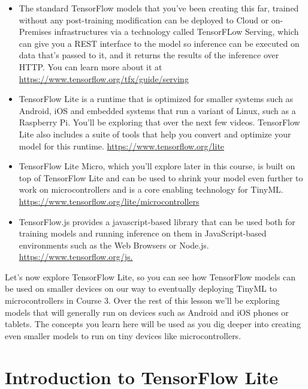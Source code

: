 \begin{itemize}
  \item The standard TensorFlow models that you’ve been creating this far, trained without any post-training modification can be deployed to Cloud or on-Premises infrastructures via a technology called TensorFLow Serving, which can give you a REST interface to the model so inference can be executed on data that’s passed to it, and it returns the results of the inference over HTTP.  You can learn more about it at \url{https://www.tensorflow.org/tfx/guide/serving}

  \item TensorFlow Lite is a runtime that is optimized for smaller systems such as Android, iOS and embedded systems that run a variant of Linux, such as a Raspberry Pi. You’ll be exploring that over the next few videos. TensorFlow Lite also includes  a suite of tools that help you convert and optimize your model for this runtime. \url{https://www.tensorflow.org/lite}
  
  \item TensorFlow Lite Micro, which you’ll explore later in this course, is built on top of TensorFlow Lite and can be used to shrink your model even further to work on microcontrollers and is a core enabling technology for TinyML. \url{https://www.tensorflow.org/lite/microcontrollers}
  
  \item TensorFlow.js provides a javascript-based library that can be used both for training models and running inference on them in JavaScript-based environments such as the Web Browsers or Node.js. \url{https://www.tensorflow.org/js.}
\end{itemize}

Let's now explore TensorFlow Lite, so you can see how TensorFlow models can be used on smaller devices on our way to eventually deploying TinyML to microcontrollers in Course 3. Over the rest of this lesson we’ll be exploring models that will generally run on devices such as Android and iOS phones or tablets. The concepts you learn here will be used as you dig deeper into creating even smaller models to run on tiny devices like microcontrollers.


\section{Introduction to TensorFlow Lite}


